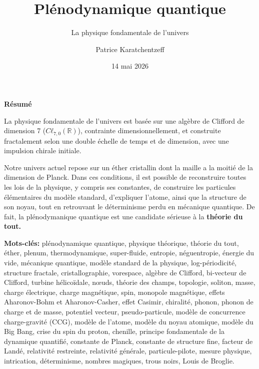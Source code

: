 \documentclass[11pt,a4paper,onecolumn,twoside]{article}
\title{Plénodynamique quantique}
\subtitle{La physique fondamentale de l'univers}
\author{Patrice Karatchentzeff}
\date{14 mai 2026}
\begin{document}
	
	
	\maketitle
	
	\begin{center}
		\begin{minipage}{0.9\textwidth}
			\begin{tcolorbox}[colback=pkcolor!13, arc=3pt, boxrule=0pt, left=6pt,
				right=6pt, top=6pt, bottom=6pt, before skip=0pt, after skip=0pt]
				
				{\color{pkcolor}\textbf{Résumé}}
				\vspace*{0.25cm}
				
				La physique fondamentale de l'univers est basée sur une algèbre de Clifford
				de dimension 7 ($Cℓ_{7,0}(\mathbb{R})$), contrainte dimensionnellement, et
				construite fractalement selon une double échelle de temps et de dimension,
				avec une impulsion chirale initiale.
				\vskip 6pt
				
				Notre univers actuel repose sur un éther cristallin dont la maille a la
				moitié de la dimension de Planck. Dans ces conditions, il est possible  de
				reconstruire toutes les lois de la physique, y compris ses constantes, de
				construire les particules élémentaires du modèle standard, d'expliquer
				l'atome, ainsi que la structure de son noyau, tout en
				retrouvant le déterminisme perdu en mécanique quantique. De fait, la plénodymanique quantique  est une candidate
				sérieuse à la \textbf{théorie du tout.}
				
				\vspace*{0.25cm}
				{ \textbf{Mots-clés:} plénodynamique quantique, physique théorique, théorie du tout, éther, plenum, thermodynamique, super-fluide, entropie, néguentropie, énergie du vide, mécanique quantique, modèle standard de la physique, log-périodicité, structure fractale, cristallographie, vorespace, algèbre de Clifford, bi-vecteur de Clifford, turbine hélicoïdale, nœuds, théorie des champs, topologie, soliton, masse, charge électrique, charge magnétique, spin, monopole magnétique, effets Aharonov-Bohm et Aharonov-Casher, effet Casimir, chiralité, phonon, phonon de charge et de masse, potentiel vecteur, pseudo-particule, modèle de concurrence charge-gravité (CCG), modèle de l'atome, modèle du noyau atomique, modèle du Big Bang, crise du spin du proton, chenille, principe fondamentale de la dynamique quantifié, constante de Planck, constante de structure fine, facteur de Landé, relativité restreinte, relativité générale, particule-pilote, mesure physique, intrication, déterminisme, nombres magiques, trous noirs, Louis de Broglie. }
			\end{tcolorbox}
		\end{minipage}	
	\end{center}
	
\end{document}

